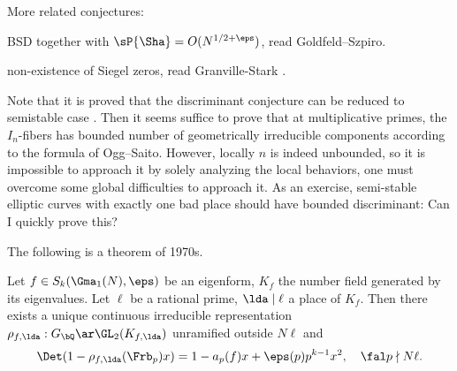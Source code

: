 \documentclass[a4paper, twoside]{article}
\begin{document}
\begin{rmk}
	More related conjectures:
	\begin{itm}
		\item BSD together with $\sP{\Sha}=O(N^{1/2+\eps})$, read Goldfeld--Szpiro\cite{GS1995Bounds}.
		\item non-existence of Siegel zeros, read Granville-Stark \cite{GS2000abc}.
	\end{itm}

	Note that it is proved that the discriminant conjecture can be reduced to semistable case \cite[Proposition~8.2]{PS2000}. Then it seems suffice to prove that at multiplicative primes, the $I_{n}$-fibers has bounded number of geometrically irreducible components according to the formula of Ogg--Saito. However, locally $n$ is indeed unbounded, so it is impossible to approach it by solely analyzing the local behaviors, one must overcome some global difficulties to approach it. As an exercise, semi-stable elliptic curves with exactly one bad place should have bounded discriminant: Can I quickly prove this?

\end{rmk}

The following is a theorem of 1970s.
\begin{thm}
	Let $f\in S_{k}(\Gma_{1}(N),\eps)$ be an eigenform, $K_{f}$ the number field generated by its eigenvalues. Let $\ell$ be a rational prime, $\lda\mid \ell$ a place of $K_{f}$. Then there exists a unique continuous irreducible representation $\rho_{f,\lda}:G_{\bQ}\ar\GL_{2}(K_{f,\lda})$ unramified outside $N\ell$ and
	\[
		\Det(1-\rho_{f,\lda}(\Frb_{p})x)=1-a_{p}(f)x+\eps(p)p^{k-1}x^{2},\quad \fal p\nmid N\ell.
	\]
\end{thm}
\end{document}
